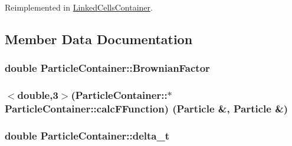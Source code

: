 Reimplemented in \hyperlink{classLinkedCellsContainer_a0dc45c921ad11aa2424b49ada44a0dfe}{Linked\+Cells\+Container}.



\subsection{Member Data Documentation}
\subsubsection[{\texorpdfstring{Brownian\+Factor}{BrownianFactor}}]{\setlength{\rightskip}{0pt plus 5cm}double Particle\+Container\+::\+Brownian\+Factor\hspace{0.3cm}{\ttfamily [protected]}}\hypertarget{classParticleContainer_a64e8a768554b5b6126755e8a8e85f2f5}{}\label{classParticleContainer_a64e8a768554b5b6126755e8a8e85f2f5}
\subsubsection[{\texorpdfstring{calc\+F\+Function}{calcFFunction}}]{$<$double,3$>$(Particle\+Container\+::$\ast$ Particle\+Container\+::calc\+F\+Function) ({\bf Particle} \&, {\bf Particle} \&)\hspace{0.3cm}{\ttfamily [protected]}}\hypertarget{classParticleContainer_a3827ee46dac1ac38cc1312c6e7dae493}{}\label{classParticleContainer_a3827ee46dac1ac38cc1312c6e7dae493}
\subsubsection[{\texorpdfstring{delta\+\_\+t}{delta_t}}]{\setlength{\rightskip}{0pt plus 5cm}double Particle\+Container\+::delta\+\_\+t\hspace{0.3cm}{\ttfamily [protected]}}\hypertarget{classParticleContainer_a00ee8dcd9a5c11b54e8fc731d38b45fa}{}\label{classParticleContainer_a00ee8dcd9a5c11b54e8fc731d38b45fa}

